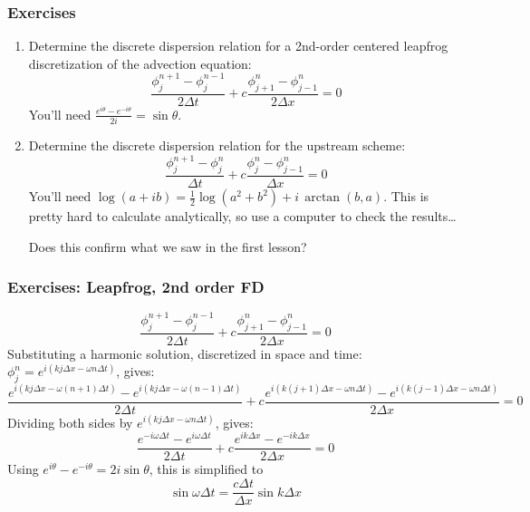 \documentclass[aspectratio=149,9pt]{beamer}
\begin{document}
\begin{frame}
	\frametitle{Exercises}
	\begin{enumerate}
		\item Determine the discrete dispersion relation for a 2nd-order centered leapfrog discretization of the advection equation:
			\begin{equation*}
				\frac{\phi_j^{n+1}-\phi_j^{n-1}}{2\Delta t}+c\frac{\phi^n_{j+1}-\phi^n_{j-1}}{2\Delta x}=0
			\end{equation*}
			You'll need $\frac{e^{i\theta}-e^{-i\theta}}{2i}=\sin\theta$.\vspace*{6ex}
		\item Determine the discrete dispersion relation for the upstream scheme:
			\begin{equation*}
				\frac{\phi_j^{n+1}-\phi_j^{n}}{\Delta t}+c\frac{\phi^n_{j}-\phi^n_{j-1}}{\Delta x}=0
			\end{equation*}
			You'll need $\log (a+ib)=\frac{1}{2}\log(a^2+b^2)+i\,\arctan(b,a)$. This is pretty hard to calculate analytically, so use a computer to check the results\ldots
			\par
			Does this confirm what we saw in the first lesson?
	\end{enumerate}
\end{frame}
%
%
\begin{frame}
	\frametitle{Exercises: Leapfrog, 2nd order FD}
	\begin{equation*}
		\frac{\phi_j^{n+1}-\phi_j^{n-1}}{2\Delta t}+c\frac{\phi^n_{j+1}-\phi^n_{j-1}}{2\Delta x}=0
	\end{equation*}
\pause
	Substituting a harmonic solution, discretized in space and time: $\phi_j^n=e^{i(kj\Delta x-\omega n \Delta t)}$, gives:
	\begin{equation*}
		\frac{e^{i(kj\Delta x-\omega (n+1)\Delta t)}-e^{i(kj\Delta x-\omega (n-1)\Delta t)}}{2\Delta t}+c\frac{e^{i(k(j+1)\Delta x-\omega n\Delta t)}-e^{i(k(j-1)\Delta x-\omega n\Delta t)}}{2\Delta x}=0
	\end{equation*}	
\pause
	Dividing both sides by $e^{i(kj\Delta x-\omega n\Delta t)}$, gives:
	\begin{equation*}
		\frac{e^{-i\omega\Delta t}-e^{i\omega\Delta t}}{2\Delta t}+c\frac{e^{ik\Delta x}-e^{-ik\Delta x}}{2\Delta x}=0
	\end{equation*}
\pause
	Using $e^{i\theta}-e^{-i\theta}=2i\sin\theta$, this is simplified to
	\begin{equation*}
		\sin\omega\Delta t=\frac{c\Delta t}{\Delta x}\sin k\Delta x
	\end{equation*}
\end{frame}
\end{document}
